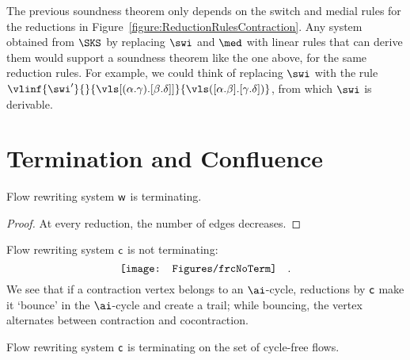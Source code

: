 \begin{remark}\label{remark:ReductionRulesSoundIndependence}
The previous soundness theorem only depends on the switch and medial rules for the reductions in Figure~\vref{figure:ReductionRulesContraction}. Any system obtained from $\SKS$ by replacing $\swi$ and $\med$ with linear rules that can derive them would support a soundness theorem like the one above, for the same reduction rules. For example, we could think of replacing $\swi$ with the rule $\vlinf{\swi'}{}{\vls[(\alpha.\gamma).[\beta.\delta]]}{\vls([\alpha.\beta].[\gamma.\delta])}$, from which $\swi$ is derivable.
\end{remark}

\section{Termination and Confluence}\label{section:TerminationConfluence}

\begin{theorem}\label{theorem:RewritingSystemWeakeningTerminating}
Flow rewriting system\/ ${\mathsf w}$ is terminating.
\end{theorem}

\begin{proof}
At every reduction, the number of edges decreases.
\end{proof}

\begin{remark}\label{remark:FRCNotTerminating}
Flow rewriting system ${\mathsf c}$ is not terminating:
\nopagebreak[4]\medskip\afnegspace
\[
\vcenter{\hbox{\texttt{[image: Figures/frcNoTerm]}}}
\quad.
\]
\afnegspace
We see that if a contraction vertex belongs to an $\ai$-cycle, reductions by ${\mathsf c}$ make it `bounce' in the $\ai$-cycle and create a trail; while bouncing, the vertex alternates between contraction and cocontraction.
\end{remark}

\begin{theorem}\label{theorem:RewritingSystemContractionTerminating}
Flow rewriting system\/ ${\mathsf c}$ is terminating on the set of cycle-free flows.
\end{theorem}

